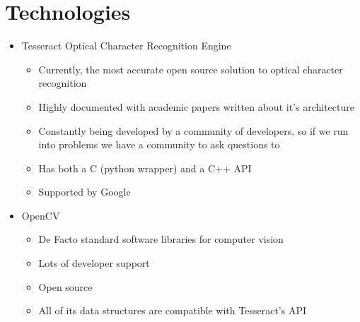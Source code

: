 	\section{Technologies}
		\begin{itemize}
			\item Tesseract Optical Character Recognition Engine
			\begin{itemize}
				\item Currently, the most accurate open source solution to optical character recognition
				\item Highly documented with academic papers written about it’s architecture
				\item Constantly being developed by a community of developers, so if we run into problems we have a community to ask questions to
				\item Has both a C (python wrapper) and a C++ API
				\item Supported by Google
			\end{itemize}

			\item OpenCV
			\begin{itemize}
				\item De Facto standard software libraries for computer vision
				\item Lots of developer support
				\item Open source
				\item All of its data structures are compatible with Tesseract's API
			\end{itemize}

%
		\end{itemize}